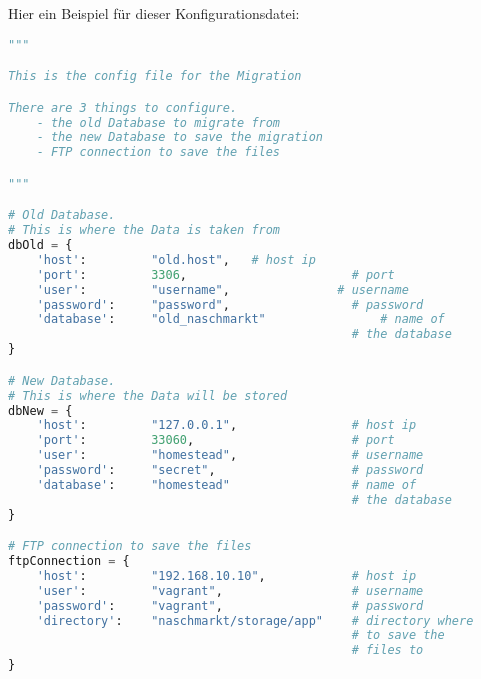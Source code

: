Hier ein Beispiel f\"ur dieser Konfigurationsdatei:
\begin{lstlisting}[language={Python}, caption=config.py]
"""

This is the config file for the Migration

There are 3 things to configure.
    - the old Database to migrate from
    - the new Database to save the migration
    - FTP connection to save the files

"""

# Old Database.
# This is where the Data is taken from
dbOld = {
    'host':         "old.host",   # host ip
    'port':         3306,                       # port
    'user':         "username",               # username
    'password':     "password",                 # password
    'database':     "old_naschmarkt"                # name of
                                                # the database
}

# New Database.
# This is where the Data will be stored
dbNew = {
    'host':         "127.0.0.1",                # host ip
    'port':         33060,                      # port
    'user':         "homestead",                # username
    'password':     "secret",                   # password
    'database':     "homestead"                 # name of
                                                # the database
}

# FTP connection to save the files
ftpConnection = {
    'host':         "192.168.10.10",            # host ip
    'user':         "vagrant",                  # username
    'password':     "vagrant",                  # password
    'directory':    "naschmarkt/storage/app"    # directory where
                                                # to save the
                                                # files to
}
\end{lstlisting}

